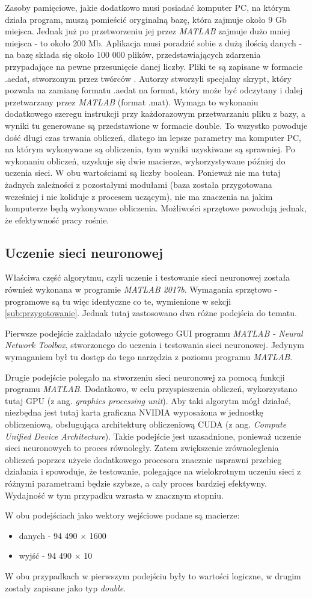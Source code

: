 Zasoby pamięciowe, jakie dodatkowo musi posiadać komputer PC, na którym działa program, muszą pomieścić oryginalną bazę, która zajmuje około 9 Gb miejsca. Jednak już po przetworzeniu jej przez \textit{MATLAB} zajmuje dużo mniej miejsca - to około 200 Mb.
Aplikacja musi poradzić sobie z dużą ilością danych - na bazę składa się około 100 000 plików,  przedstawiających zdarzenia przypadające na pewne przesunięcie danej liczby. Pliki te są zapisane w formacie .aedat, stworzonym przez twórców \cite{MNIST_DVS}. Autorzy stworzyli specjalny skrypt, który pozwala na zamianę formatu .aedat na format, który może być odczytany i dalej przetwarzany przez \textit{MATLAB} (format .mat). Wymaga to wykonaniu dodatkowego szeregu instrukcji przy każdorazowym przetwarzaniu pliku z bazy, a wyniki tu generowane są przedstawione w formacie double. To wszystko powoduje dość długi czas trwania obliczeń, dlatego im lepsze parametry ma komputer PC, na którym wykonywane są obliczenia, tym wyniki uzyskiwane są sprawniej. Po wykonaniu obliczeń, uzyskuje się dwie macierze, wykorzystywane później do uczenia sieci. W obu wartościami są liczby boolean. Ponieważ nie ma tutaj żadnych zależności z pozostałymi modułami (baza została przygotowana wcześniej i nie koliduje z procesem uczącym), nie ma znaczenia na jakim komputerze będą wykonywane obliczenia. Możliwości sprzętowe powodują jednak, że efektywność pracy rośnie.

\subsection{Uczenie sieci neuronowej}
\label{sub:uczenie}

Właściwa część algorytmu, czyli uczenie i testowanie sieci neuronowej została również wykonana w programie \textit{MATLAB 2017b}. Wymagania sprzętowo - programowe są tu więc identyczne co te, wymienione w sekcji \ref{sub:przygotowanie}. Jednak tutaj zastosowano dwa różne podejścia do tematu.

Pierwsze podejście zakładało użycie gotowego GUI programu \textit{MATLAB - Neural Network Toolbox}, stworzonego do uczenia i testowania sieci neuronowej. Jedynym wymaganiem był tu dostęp do tego narzędzia z poziomu programu \textit{MATLAB}. 

Drugie podejście polegało na stworzeniu sieci neuronowej za pomocą funkcji programu \textit{MATLAB}. Dodatkowo, w celu przyspieszenia obliczeń, wykorzystano tutaj GPU (z ang. \textit{ graphics processing unit}). Aby taki algorytm mógł działać, niezbędna jest tutaj karta graficzna NVIDIA wyposażona w jednostkę obliczeniową, obsługująca architekturę obliczeniową CUDA (z ang. \textit{Compute Unified Device Architecture}). Takie podejście jest uzasadnione, ponieważ uczenie sieci neuronowych to proces równoległy. Zatem zwiększenie zrównoleglenia obliczeń poprzez użycie dodatkowego procesora znacznie usprawni przebieg działania i spowoduje, że testowanie, polegające na wielokrotnym uczeniu sieci z różnymi parametrami będzie szybsze, a cały proces bardziej efektywny. Wydajność w tym przypadku wzrasta w znacznym stopniu.

W obu podejściach jako wektory wejściowe podane są macierze:

\begin{itemize}
\item danych -  94 490 $\times$ 1600
\item wyjść -  94 490 $\times$ 10 
\end{itemize}
W obu przypadkach w pierwszym podejściu były to wartości logiczne, w drugim zostały zapisane jako typ \textit{double}.
